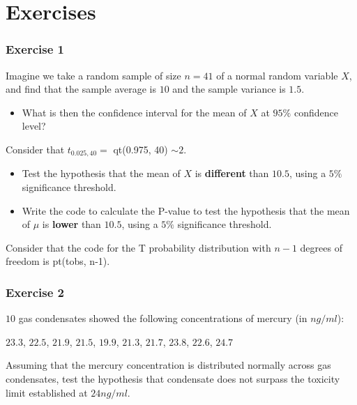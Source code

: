 \documentclass[
]{book}
\providecommand{\tightlist}{%
  \setlength{\itemsep}{0pt}\setlength{\parskip}{0pt}}
\begin{document}
\hypertarget{exercises-12}{%
\section{Exercises}\label{exercises-12}}

\hypertarget{exercise-1-12}{%
\subsubsection{Exercise 1}\label{exercise-1-12}}

Imagine we take a random sample of size \(n = 41\) of a normal random variable \(X\), and find that the sample average is \(10\) and the sample variance is \(1.5\).

\begin{itemize}
\tightlist
\item
  What is then the confidence interval for the mean of \(X\) at \(95\%\) confidence level?
\end{itemize}

Consider that \(t_{0.025,40}=\) qt(0.975, 40) \(\sim 2\).

\begin{itemize}
\item
  Test the hypothesis that the mean of \(X\) is \textbf{different} than \(10.5\), using a \(5\%\) significance threshold.
\item
  Write the code to calculate the P-value to test the hypothesis that the mean of \(\mu\) is \textbf{lower} than \(10.5\), using a \(5\%\) significance threshold.
\end{itemize}

Consider that the code for the T probability distribution with \(n-1\) degrees of freedom is pt(tobs, n-1).

\hypertarget{exercise-2-12}{%
\subsubsection{Exercise 2}\label{exercise-2-12}}

\(10\) gas condensates showed the following concentrations of mercury (in \(ng/ml\)):

\(23.3\), \(22.5\), \(21.9\), \(21.5\), \(19.9\), \(21.3\), \(21.7\), \(23.8\), \(22.6\), \(24.7\)

Assuming that the mercury concentration is distributed normally across gas condensates, test the hypothesis that condensate does not surpass the toxicity limit established at \(24 ng/ml\).
\end{document}
